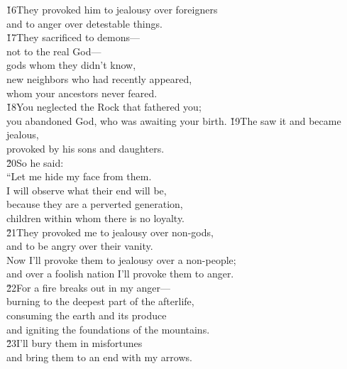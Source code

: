 \begin{poetry}
\poeml \v{16}They provoked him to jealousy over foreigners \\
\poemll    and to anger over detestable things. \\
\poeml \v{17}They sacrificed to demons--- \\
\poemll    not to the real God--- \\
\poeml gods whom they didn't know, \\
\poemll    new neighbors who had recently appeared, \\
\poemlll       whom your ancestors never feared. \\
\poeml \v{18}You neglected the Rock that fathered you; \\
\poemll    you abandoned God, who was awaiting your birth.
\poeml \v{19}The  saw it and became jealous, \\
\poemll    provoked by his sons and daughters. \\
\poeml \v{20}So he said: \\
\poeml ``Let me hide my face from them. \\
\poemll    I will observe what their end will be, \\
\poeml because they are a perverted generation, \\
\poemll    children within whom there is no loyalty. \\
\poeml \v{21}They provoked me to jealousy over non-gods, \\
\poemll    and to be angry over their vanity. \\
\poeml Now I'll provoke them to jealousy over a non-people; \\
\poemll    and over a foolish nation I'll provoke them to anger. \\
\poeml \v{22}For a fire breaks out in my anger--- \\
\poemll    burning to the deepest part of the afterlife, \\
\poeml consuming the earth and its produce \\
\poemll    and igniting the foundations of the mountains. \\
\poeml \v{23}I'll bury them in misfortunes \\
\poemll    and bring them to an end with my arrows. \\

\end{poetry}
